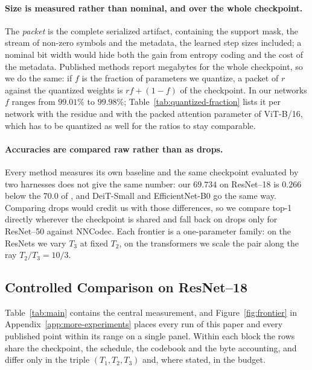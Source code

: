 \documentclass{article}
\begin{document}
\paragraph{Size is measured rather than nominal, and over the whole checkpoint.}
The \emph{packet} is the complete serialized artifact, containing the support
mask, the stream of non-zero symbols and the metadata, the learned step sizes
included; a nominal bit width would hide both the gain from entropy coding and the
cost of the metadata. Published methods report megabytes for the whole checkpoint,
so we do the same: if $f$ is the fraction of parameters we quantize, a packet of
$r$ against the quantized weights is $rf+(1-f)$ of the checkpoint. In our networks
$f$ ranges from $99.01\%$ to $99.98\%$; Table~\ref{tab:quantized-fraction} lists it
per network with the residue and with the packed attention parameter of ViT-B/16,
which has to be quantized as well for the ratios to stay comparable.

\paragraph{Accuracies are compared raw rather than as drops.}
Every method measures its own baseline and the same checkpoint evaluated by two
harnesses does not give the same number: our $69.734$ on ResNet--18 is $0.266$
below the $70.0$ of \citet{oktay2020epr}, and DeiT-Small and EfficientNet-B0 go
the same way. Comparing drops would credit us with those differences, so we
compare top-1 directly wherever the checkpoint is shared and fall back on drops
only for ResNet--50 against NNCodec. Each frontier is a one-parameter family: on
the ResNets we vary $T_3$ at fixed $T_2$, on the transformers we scale the pair
along the ray $T_2/T_3=10/3$.

\subsection{Controlled Comparison on ResNet--18}
\label{sec:controlled-comparison}

Table~\ref{tab:main} contains the central measurement, and
Figure~\ref{fig:frontier} in Appendix~\ref{app:more-experiments} places every run
of this paper and every published point within its range on a single panel. Within each block the rows share the checkpoint, the
schedule, the codebook and the byte accounting, and differ only in the triple
$(T_1,T_2,T_3)$ and, where stated, in the budget.
\end{document}
